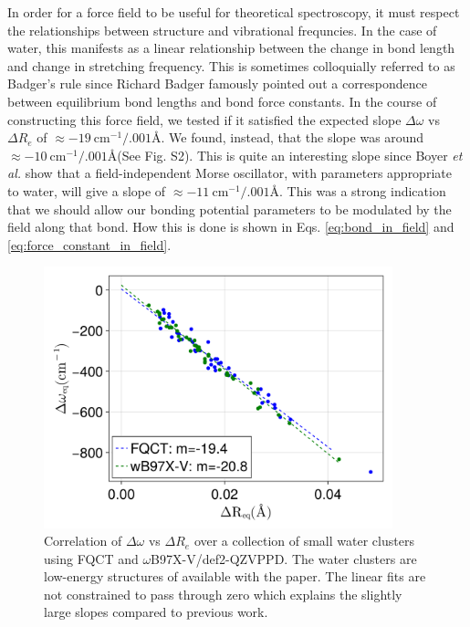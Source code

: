 \documentclass[journal=jctcce,manuscript=article]{achemso}
\begin{document}
In order for a force field to be useful for theoretical spectroscopy, it must respect the relationships between structure and vibrational frequncies. In the case of water, this manifests as a linear relationship between the change in bond length and change in  stretching frequency.\cite{boyer2019beyond} This is sometimes colloquially referred to as Badger's rule since Richard Badger famously pointed out a correspondence between equilibrium bond lengths and bond force constants.\cite{badger1934relation} In the course of constructing this force field, we tested if it satisfied the expected slope $\Delta\omega$ vs $\Delta R_e$ of $\approx -19\ \mathrm{cm^{-1}/.001}$\AA\cite{boyer2019beyond}. We found, instead, that the slope was around $\approx -10\ \mathrm{cm^{-1}/.001}$\AA (See Fig. S2). This is quite an interesting slope since Boyer \textit{et al.} show that a field-independent Morse oscillator, with parameters appropriate to water, will give a slope of $\approx -11\ \mathrm{cm^{-1}/.001}$\AA. This was a strong indication that we should allow our bonding potential parameters to be modulated by the field along that bond. How this is done is shown in Eqs. \ref{eq:bond_in_field} and \ref{eq:force_constant_in_field}.
\begin{figure}[h]
  \includegraphics*[width=0.9\textwidth]{figures/badger_correlation_final.png}
  \caption{Correlation of $\Delta\omega$ vs $\Delta R_e$ over a collection
  of small water clusters using FQCT and $\omega$B97X-V/def2-QZVPPD.
  The water clusters are low-energy structures of  available
  with the paper. The linear fits are not constrained to pass through zero
  which explains the slightly large slopes compared to previous work.\cite{boyer2019beyond}
}
  \label{fig:badger2}
\end{figure}
\end{document}
